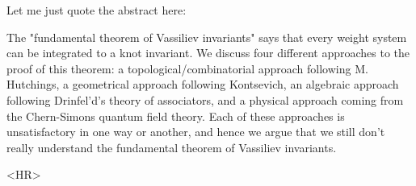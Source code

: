 Let me just quote the abstract here:

  The "fundamental theorem of Vassiliev invariants" says that every weight
system can be integrated to a knot invariant. We discuss four different
approaches to the proof of this theorem: a topological/combinatorial approach
following M. Hutchings, a geometrical approach following Kontsevich, an
algebraic approach following Drinfel'd's theory of associators, and a physical
approach coming from the Chern-Simons quantum field theory. Each of these
approaches is unsatisfactory in one way or another, and hence we argue that we
still don't really understand the fundamental theorem of Vassiliev invariants.

<HR>



